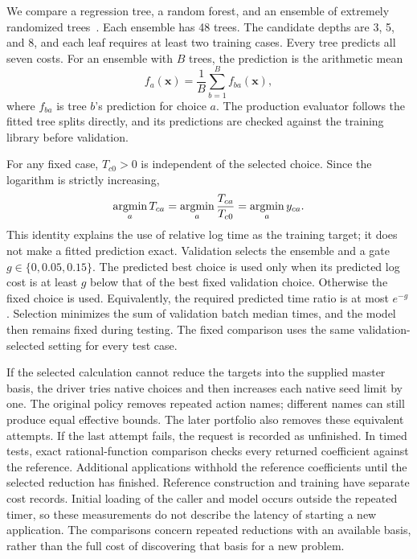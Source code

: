 We compare a regression tree, a random forest, and an ensemble of extremely randomized trees~\cite{CART1984,Breiman2001Forest,Geurts2006ExtraTrees}. Each ensemble has 48 trees. The candidate depths are 3, 5, and 8, and each leaf requires at least two training cases. Every tree predicts all seven costs. For an ensemble with $B$ trees, the prediction is the arithmetic mean
\begin{equation}
 f_a(\boldsymbol x)=\frac1B\sum_{b=1}^{B}f_{ba}(\boldsymbol x),
 \label{eq:adaptive-forest}
\end{equation}
where $f_{ba}$ is tree $b$'s prediction for choice $a$. The production evaluator follows the fitted tree splits directly, and its predictions are checked against the training library before validation.

For any fixed case, $T_{c0}>0$ is independent of the selected choice. Since the logarithm is strictly increasing,
\begin{equation}
 \mathop{\rm argmin}_a T_{ca}
 =\mathop{\rm argmin}_a \frac{T_{ca}}{T_{c0}}
 =\mathop{\rm argmin}_a y_{ca}.
 \label{eq:adaptive-argmin}
\end{equation}
This identity explains the use of relative log time as the training target; it does not make a fitted prediction exact. Validation selects the ensemble and a gate $g\in\{0,0.05,0.15\}$. The predicted best choice is used only when its predicted log cost is at least $g$ below that of the best fixed validation choice. Otherwise the fixed choice is used. Equivalently, the required predicted time ratio is at most $e^{-g}$. Selection minimizes the sum of validation batch median times, and the model then remains fixed during testing. The fixed comparison uses the same validation-selected setting for every test case.

If the selected calculation cannot reduce the targets into the supplied master basis, the driver tries native choices and then increases each native seed limit by one. The original policy removes repeated action names; different names can still produce equal effective bounds. The later portfolio also removes these equivalent attempts. If the last attempt fails, the request is recorded as unfinished. In timed tests, exact rational-function comparison checks every returned coefficient against the reference. Additional applications withhold the reference coefficients until the selected reduction has finished. Reference construction and training have separate cost records. Initial loading of the caller and model occurs outside the repeated timer, so these measurements do not describe the latency of starting a new application. The comparisons concern repeated reductions with an available basis, rather than the full cost of discovering that basis for a new problem.

